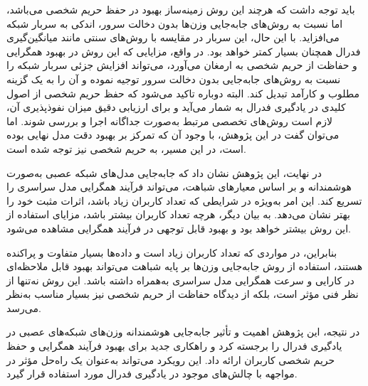 
باید توجه داشت که هرچند این روش زمینه‌ساز بهبود در حفظ حریم شخصی می‌باشد، اما نسبت به روش‌های جابه‌جایی وزن‌ها بدون دخالت سرور، اندکی به سربار شبکه می‌افزاید. با این حال، این سربار در مقایسه با روش‌های سنتی مانند میانگین‌گیری فدرال همچنان بسیار کمتر خواهد بود. در واقع، مزایایی که این روش در بهبود همگرایی و حفاظت از حریم شخصی به ارمغان می‌آورد، می‌تواند افزایش جزئی سربار شبکه را نسبت به روش‌های جابه‌جایی بدون دخالت سرور توجیه نموده و آن را به یک گزینه مطلوب و کارآمد تبدیل کند.
البته دوباره تاکید می‌شود که حفظ حریم شخصی از اصول کلیدی در یادگیری فدرال به شمار می‌آید و برای ارزیابی دقیق میزان نفوذپذیری آن، لازم است روش‌های تخصصی مرتبط به‌صورت جداگانه اجرا و بررسی شوند. اما می‌توان گفت در این پژوهش، با وجود آن که تمرکز بر بهبود دقت مدل نهایی بوده است، در این مسیر، به حریم شخصی نیز توجه شده است.

در نهایت، این پژوهش نشان داد که جابه‌جایی مدل‌های شبکه عصبی به‌صورت هوشمندانه و بر اساس معیارهای شباهت، می‌تواند فرآیند همگرایی مدل سراسری را تسریع کند. این امر به‌ویژه در شرایطی که تعداد کاربران زیاد باشد، اثرات مثبت خود را بهتر نشان می‌دهد. به بیان دیگر، هرچه تعداد کاربران بیشتر باشد، مزایای استفاده از این روش بیشتر خواهد بود و بهبود قابل توجهی در فرآیند همگرایی مشاهده می‌شود.

بنابراین، در مواردی که تعداد کاربران زیاد است و داده‌ها بسیار متفاوت و پراکنده هستند، استفاده از روش‌ جابه‌جایی وزن‌ها بر پایه شباهت می‌تواند بهبود قابل ملاحظه‌ای در کارایی و سرعت همگرایی مدل سراسری به‌همراه داشته باشد. این روش نه‌تنها از نظر فنی مؤثر است، بلکه از دیدگاه حفاظت از حریم شخصی نیز بسیار مناسب به‌نظر می‌رسد.

در نتیجه، این پژوهش اهمیت و تأثیر جابه‌جایی هوشمندانه وزن‌های شبکه‌های عصبی در یادگیری فدرال را برجسته کرد و راهکاری جدید برای بهبود فرآیند همگرایی و حفظ حریم شخصی کاربران ارائه داد. این رویکرد می‌تواند به‌عنوان یک راه‌حل مؤثر در مواجهه با چالش‌های موجود در یادگیری فدرال مورد استفاده قرار گیرد.


